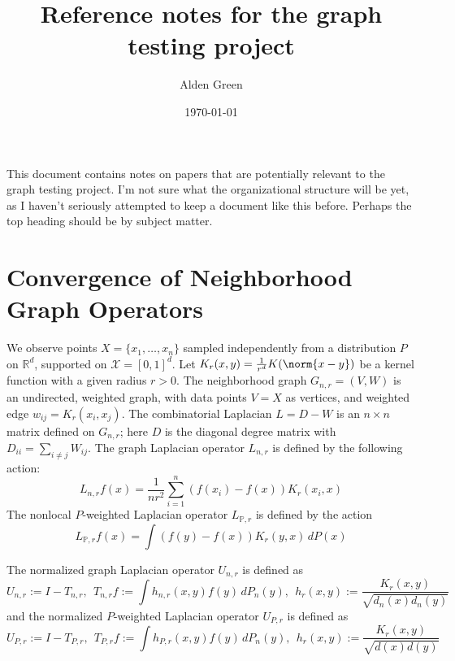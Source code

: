 \documentclass{article}
\newcommand{\Reals}{\mathbb{R}}
\newcommand{\1}{\mathbf{1}}
\newcommand{\Xset}{\mathcal{X}}
\newcommand{\Pbb}{\mathbb{P}}
\theoremstyle{alden}
\theoremstyle{aldenthm}
\theoremstyle{definition}
\theoremstyle{remark}
\begin{document}
\title{Reference notes for the graph testing project}
\author{Alden Green}
\date{\today}
\maketitle

This document contains notes on papers that are potentially relevant to the graph testing project. I'm not sure what the organizational structure will be yet, as I haven't seriously attempted to keep a document like this before. Perhaps the top heading should be by subject matter.

\section{Convergence of Neighborhood Graph Operators}

We observe points $X = \{x_1,\ldots,x_n\}$ sampled independently from a distribution $P$ on $\Reals^d$, supported on $\Xset = [0,1]^d$. Let $K_r(x,y) = \frac{1}{r^d} K(\norm{x - y})$ be a kernel function with a given radius $r > 0$. The neighborhood graph $G_{n,r} = (V,W)$ is an undirected, weighted graph, with data points $V = X$ as vertices, and weighted edge $w_{ij} = K_r(x_i,x_j)$. The combinatorial Laplacian $L = D - W$ is an $n \times n$ matrix defined on $G_{n,r}$; here $D$ is the diagonal degree matrix with $D_{ii} = \sum_{i \neq j} W_{ij}$. The graph Laplacian operator $L_{n,r}$ is defined by the following action:
\begin{equation*}
L_{n,r}f(x) = \frac{1}{nr^2}\sum_{i = 1}^{n}(f(x_i) - f(x))K_r(x_i,x)
\end{equation*}
The nonlocal $P$-weighted Laplacian operator $L_{\Pbb,r}$ is defined by the action
\begin{equation*}
L_{\Pbb,r}f(x) = \int (f(y) - f(x))K_r(y,x) \,dP(x)
\end{equation*}

The normalized graph Laplacian operator $U_{n,r}$ is defined as
\begin{equation*}
U_{n,r} := I - T_{n,r},~~ T_{n,r}f := \int h_{n,r}(x,y)f(y)\,dP_n(y), ~~h_r(x,y) := \frac{K_r(x,y)}{\sqrt{d_n(x)d_n(y)}}
\end{equation*}
and the normalized $P$-weighted Laplacian operator $U_{P,r}$ is defined as
\begin{equation*}
U_{P,r} := I - T_{P,r},~~ T_{P,r}f := \int h_{P,r}(x,y)f(y)\,dP_n(y), ~~h_r(x,y) := \frac{K_r(x,y)}{\sqrt{d(x)d(y)}}
\end{equation*}
\end{document}
